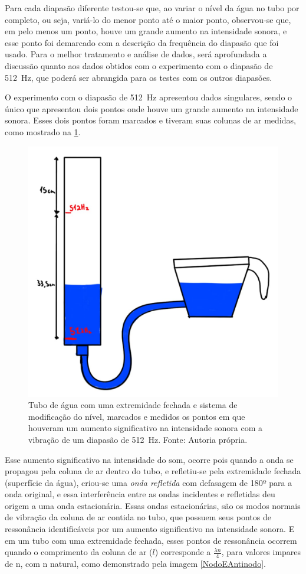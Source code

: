 Para cada diapasão diferente testou-se que, ao variar o nível da água no tubo por completo, ou seja, variá-lo do menor ponto até o maior ponto, observou-se que, em pelo menos um ponto, houve um grande aumento na intensidade sonora, e esse ponto foi demarcado com a descrição da frequência do diapasão que foi usado. Para o melhor tratamento e análise de dados, será aprofundada a discussão quanto aos dados obtidos com o experimento com o diapasão de \qty{512}{Hz}, que poderá ser abrangida para os testes com os outros diapasões.

O experimento com o diapasão de \qty{512}{Hz} apresentou dados singulares, sendo o único que apresentou dois pontos onde houve um grande aumento na intensidade sonora.  Esses dois pontos foram marcados e tiveram suas colunas de ar medidas, como mostrado na \cref{TuboFechado}.
\begin{figure}[H]
    \centering
    \includegraphics[width=0.35\linewidth]{fig/TuboFechado.png}
    \caption{Tubo de água com uma extremidade fechada e sistema de modificação do nível, marcados e medidos os pontos em que houveram um aumento significativo na intensidade sonora com a vibração de um diapasão de \qty{512}{Hz}. Fonte: Autoria própria.}
    \label{TuboFechado}
\end{figure}

Esse aumento significativo na intensidade do som, ocorre pois quando a onda se propagou pela coluna de ar dentro do tubo, e refletiu-se pela extremidade fechada (superfície da água), criou-se uma \textit{onda refletida} com defasagem de 180º para a onda original, e essa interferência entre as ondas incidentes e refletidas deu origem a uma onda estacionária. Essas ondas estacionárias, são os modos normais de vibração da coluna de ar contida no tubo, que possuem seus pontos de ressonância identificáveis por um aumento significativo na intensidade sonora. E em um tubo com uma extremidade fechada, esses pontos de ressonância ocorrem quando o comprimento da coluna de ar (\(l\)) corresponde a \(\frac{\lambda n}{4}\), para valores impares de n, com n natural, como demonstrado pela imagem \cref{NodoEAntinodo}. 

